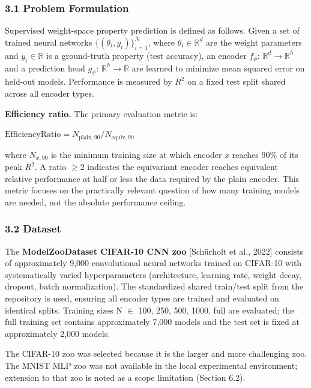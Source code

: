 
\subsubsection{3.1 Problem Formulation}

Supervised weight-space property prediction is defined as follows. Given a set of trained neural networks $\{(\theta_i, y_i)\}_{i=1}^N$, where $\theta_i \in \mathbb{R}^d$ are the weight parameters and $y_i \in \mathbb{R}$ is a ground-truth property (test accuracy), an encoder $f_\phi$: $\mathbb{R}^d \rightarrow \mathbb{R}^h$ and a prediction head $g_\psi$: $\mathbb{R}^h \rightarrow \mathbb{R}$ are learned to minimize mean squared error on held-out models. Performance is measured by $R^2$ on a fixed test split shared across all encoder types.

\textbf{Efficiency ratio.} The primary evaluation metric is:

    $\text{EfficiencyRatio} = N_{\text{plain},90} / N_{\text{equiv},90}$

where $N_{x,90}$ is the minimum training size at which encoder $x$ reaches 90\% of its peak $R^2$. A ratio $\geq 2$ indicates the equivariant encoder reaches equivalent relative performance at half or less the data required by the plain encoder. This metric focuses on the practically relevant question of how many training models are needed, not the absolute performance ceiling.

\subsubsection{3.2 Dataset}

The \textbf{ModelZooDataset CIFAR-10 CNN zoo} [Schürholt et al., 2022] consists of approximately 9,000 convolutional neural networks trained on CIFAR-10 with systematically varied hyperparameters (architecture, learning rate, weight decay, dropout, batch normalization). The standardized shared train/test split from the repository is used, ensuring all encoder types are trained and evaluated on identical splits. Training sizes N $\in$ {100, 250, 500, 1000, full} are evaluated; the full training set contains approximately 7,000 models and the test set is fixed at approximately 2,000 models.

The CIFAR-10 zoo was selected because it is the larger and more challenging zoo. The MNIST MLP zoo was not available in the local experimental environment; extension to that zoo is noted as a scope limitation (Section 6.2).

